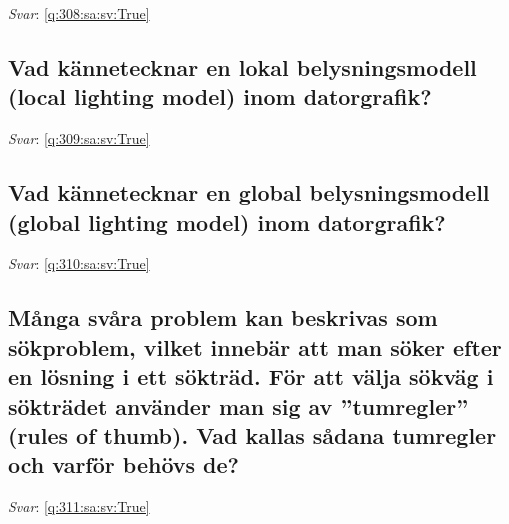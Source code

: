 \documentclass[a4paper,11pt,oneside]{article}
\begin{document}
\begin{sloppypar}
\textit{Svar}: \autoref{q:308:sa:sv:True}



\subsection{Vad k\"annetecknar en lokal belysningsmodell (local lighting model) inom datorgrafik?}

\label{q:309:sa:sv:False}

\vspace{2cm}

\noindent\makebox[\textwidth]{\hrulefill}

\vspace{1cm}

\textit{Svar}: \autoref{q:309:sa:sv:True}



\subsection{Vad k\"annetecknar en global belysningsmodell (global lighting model) inom datorgrafik?}

\label{q:310:sa:sv:False}

\vspace{2cm}

\noindent\makebox[\textwidth]{\hrulefill}

\vspace{1cm}

\textit{Svar}: \autoref{q:310:sa:sv:True}



\subsection{M\r{a}nga sv\r{a}ra problem kan beskrivas som s\"okproblem, vilket inneb\"ar att man s\"oker efter en l\"osning i ett s\"oktr\"ad. F\"or att v\"alja s\"okv\"ag i s\"oktr\"adet anv\"ander man sig av {\textquotedblright}tumregler{\textquotedblright} (rules of thumb). Vad kallas s\r{a}dana tumregler och varf\"or beh\"ovs de?}

\label{q:311:sa:sv:False}

\vspace{2cm}

\noindent\makebox[\textwidth]{\hrulefill}

\vspace{1cm}

\textit{Svar}: \autoref{q:311:sa:sv:True}




\end{sloppypar}
\end{document}
